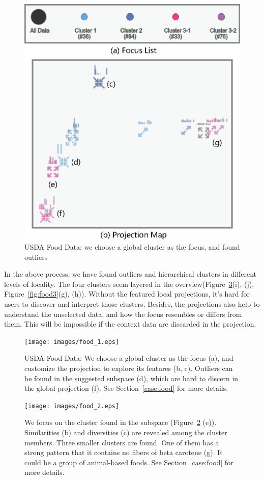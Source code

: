 \begin{figure}[htbp]
\centering
  \includegraphics[width=0.85\linewidth]{images/map_1.eps}%
  \caption{USDA Food Data: we choose a global cluster as the focus, and found outliers }
\label{fig:map}
  \end{figure}

In the above process, we have found outliers and hierarchical clusters in different levels of locality. The four clusters seem layered in the overview(Figure~\ref{fig:food2}(i), (j), Figure~\ref{fig:food3}(g), (h)). Without the featured local projections, it's hard for users to discover and interpret those clusters. Besides, the projections also help to understand the unselected data, and how the focus resembles or differs from them. This will be impossible if the context data are discarded in the projection.

\begin{figure}[htbp]
\centering
  \texttt{[image: images/food\_1.eps]}%
  \caption{USDA Food Data: We choose a global cluster as the focus (a), and customize the projection to explore its features (b, c). Outliers can be found in the suggested subspace (d), which are hard to discern in the global projection (f). See Section~\ref{case:food} for more details.}
\label{fig:food1}
  \end{figure}

\begin{figure}[htbp]
\centering
  \texttt{[image: images/food\_2.eps]}%
  \caption{We focus on the cluster found in the subspace (Figure~\ref{fig:food1} (e)). Similarities (b) and diversities (c) are revealed among the cluster members. Three smaller clusters are found. One of them has a strong pattern that it contains no fibers of beta carotene (g). It could be a group of animal-based foods. See Section~\ref{case:food} for more details.}
\label{fig:food2}
  \end{figure}

